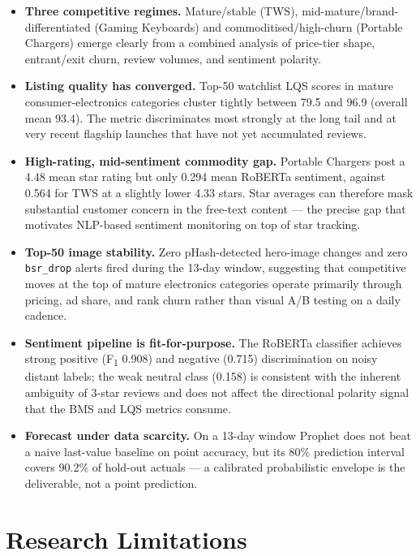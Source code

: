 \begin{itemize}
  \item \textbf{Three competitive regimes.} Mature/stable (TWS),
  mid-mature/brand-differentiated (Gaming Keyboards) and
  commoditised/high-churn (Portable Chargers) emerge clearly from a
  combined analysis of price-tier shape, entrant/exit churn, review
  volumes, and sentiment polarity.
  \item \textbf{Listing quality has converged.} Top-50 watchlist LQS
  scores in mature consumer-electronics categories cluster tightly between
  79.5 and 96.9 (overall mean 93.4). The metric discriminates most
  strongly at the long tail and at very recent flagship launches that have
  not yet accumulated reviews.
  \item \textbf{High-rating, mid-sentiment commodity gap.} Portable
  Chargers post a 4.48 mean star rating but only 0.294 mean RoBERTa
  sentiment, against 0.564 for TWS at a slightly lower 4.33 stars. Star
  averages can therefore mask substantial customer concern in the
  free-text content --- the precise gap that motivates NLP-based
  sentiment monitoring on top of star tracking.
  \item \textbf{Top-50 image stability.} Zero pHash-detected hero-image
  changes and zero \texttt{bsr\_drop} alerts fired during the 13-day
  window, suggesting that competitive moves at the top of mature
  electronics categories operate primarily through pricing, ad share, and
  rank churn rather than visual A/B testing on a daily cadence.
  \item \textbf{Sentiment pipeline is fit-for-purpose.} The RoBERTa
  classifier achieves strong positive (F\textsubscript{1} 0.908) and
  negative (0.715) discrimination on noisy distant labels; the
  weak neutral class (0.158) is consistent with the inherent ambiguity of
  3-star reviews and does not affect the directional polarity signal that
  the BMS and LQS metrics consume.
  \item \textbf{Forecast under data scarcity.} On a 13-day window
  Prophet does not beat a naive last-value baseline on point accuracy,
  but its 80\% prediction interval covers 90.2\% of hold-out actuals ---
  a calibrated probabilistic envelope is the deliverable, not a
  point prediction.
\end{itemize}

\section{Research Limitations}

